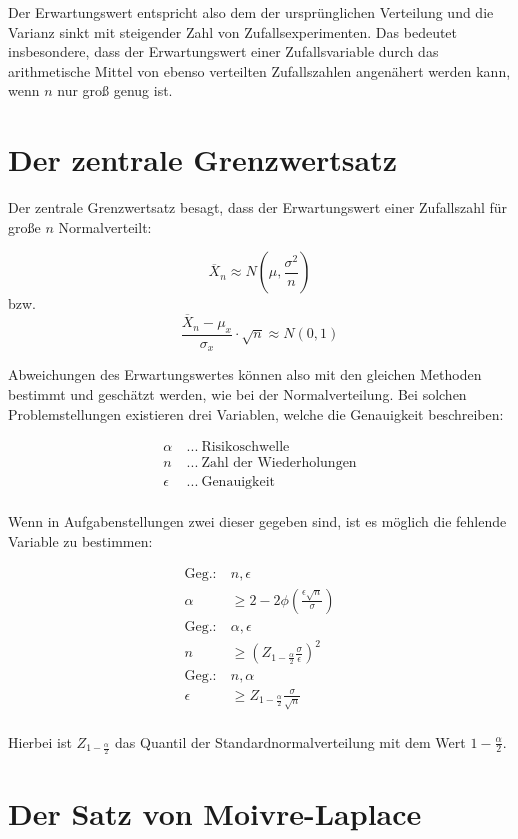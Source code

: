 Der Erwartungswert entspricht also dem der ursprünglichen Verteilung und die Varianz sinkt mit steigender Zahl von Zufallsexperimenten.
Das bedeutet insbesondere, dass der Erwartungswert einer Zufallsvariable durch das arithmetische Mittel von ebenso verteilten Zufallszahlen angenähert werden kann, wenn $n$ nur groß genug ist.

\section{Der zentrale Grenzwertsatz}

Der zentrale Grenzwertsatz besagt, dass der Erwartungswert einer Zufallszahl für große $n$ Normalverteilt:

\[\overline{X}_n \approx N(\mu, \frac{\sigma^2}{n})\]
bzw.
\[ \frac{\overline{X}_n -\mu_x}{\sigma_x} \cdot \sqrt{n} \approx N(0,1) \]

Abweichungen des Erwartungswertes können also mit den gleichen Methoden bestimmt und geschätzt werden, wie bei der Normalverteilung.
Bei solchen Problemstellungen existieren drei Variablen, welche die Genauigkeit beschreiben:

\begin{align*}
  \alpha&\: ...\: \text{Risikoschwelle}\\
  n&\: ...\: \text{Zahl der Wiederholungen}\\
  \epsilon&\: ...\: \text{Genauigkeit}\\
\end{align*}

Wenn in Aufgabenstellungen zwei dieser gegeben sind, ist es möglich die fehlende Variable zu bestimmen:

\begin{align*}
  \text{Geg.:} \:  &n, \epsilon\\
  \alpha &\ge 2-2\phi\left(\frac{\epsilon\sqrt{n}}{\sigma}\right)\\
  \text{Geg.:} \:  &\alpha, \epsilon\\
  n &\ge \left(Z_{1-\frac{\alpha}{2}}\frac{\sigma}{\epsilon}\right)^2\\
  \text{Geg.:} \:  &n, \alpha\\
  \epsilon &\ge Z_{1-\frac{\alpha}{2}}\frac{\sigma}{\sqrt{n}}\\
\end{align*}

Hierbei ist $Z_{1-\frac{\alpha}{2}}$ das Quantil der Standardnormalverteilung mit dem Wert $1-\frac{\alpha}{2}$.

\section{Der Satz von Moivre-Laplace}

